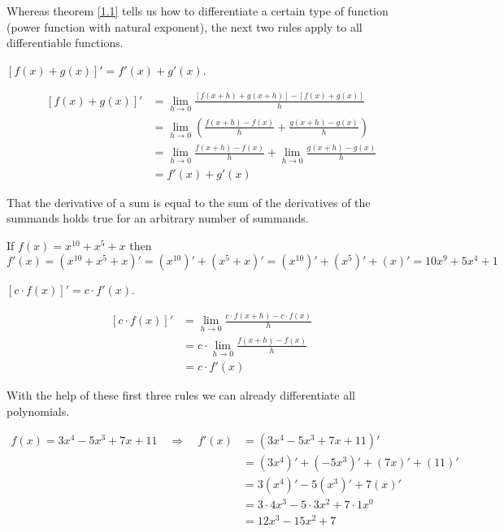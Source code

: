 \documentclass[12pt,eng]{skript_ogg}
\begin{document}
Whereas theorem \ref{1.1} tells us how to differentiate a certain type of function (power function with natural exponent), the next two rules apply to all differentiable functions.

\begin{satz}$\left[ f(x)+g(x)\right]'=f'(x)+g'(x)$.
\end{satz}
\vspace{-0.5cm}
\begin{beweis}
\vspace{-0.5cm}
\begin{align*}
\left[f(x)+g(x)\right]'&=\lim_{h\rightarrow
  0}\frac{\left[f(x+h)+g(x+h)\right]-\left[f(x)+g(x)\right]}{h
}\\
&=\lim_{h\rightarrow
  0}\left(\frac{f(x+h)-f(x)}{h}+\frac{g(x+h)-g(x)}{h} \right)
\\
&=\lim_{h\rightarrow 0}\frac{f(x+h)-f(x)}{h}+
\lim_{h\rightarrow 0}
\frac{g(x+h)-g(x)}{h} \\
&=f'(x)+g'(x)
\end{align*}
\end{beweis}
That the derivative of a sum is equal to the sum of the derivatives of the summands holds true for an arbitrary number of summands.
\begin{beispiel}
If $f(x)=x^{10}+x^5+x$ then 
\[f'(x)=\left( x^{10}+x^5+x\right)'=\left( x^{10}\right) '+\left( x^5+x\right)' =\left( x^{10}\right)' +\left( x^5\right)'+\left(x\right)'=10x^9+5x^4 +1\]
\end{beispiel}

\begin{satz}$\left[ c\cdot f(x)\right]'=c\cdot f'(x)$.
\end{satz}
\vspace{-0.5cm}
\begin{beweis}
\vspace{-0.5cm}
\begin{align*}
\left[ c\cdot f(x)\right]'&=\lim_{h\rightarrow
  0} \frac{c\cdot f(x+h)-c\cdot f(x)}{h} \\
&=c\cdot \lim_{h\rightarrow
  0}\frac{f(x+h)-f(x)}{h} \\
&=c\cdot f'(x)
\end{align*}
\end{beweis}
With the help of these first three rules we can already differentiate all polynomials.

\begin{beispiel}
\vspace{-2mm}
\begin{align*}
f(x)=3x^4-5x^3+7x+11\quad\Rightarrow\quad f'(x) &=(3x^4-5x^3+7x+11)'\\
&=(3x^4)'+(-5x^3)'+(7x)'+(11)'\\
&=3(x^4)'-5(x^3)'+7(x)'\\
&=3\cdot4x^3-5\cdot3x^2+7\cdot1x^0\\
&=12x^3-15x^2+7
\end{align*}
\end{beispiel}
\end{document}
